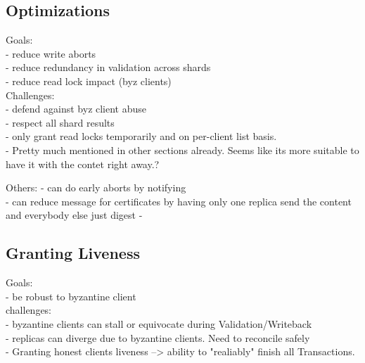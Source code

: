 \subsection{Optimizations}
Goals:\\
- reduce write aborts\\
- reduce redundancy in validation across shards\\
- reduce read lock impact (byz clients)\\

Challenges:\\
- defend against byz client abuse\\
- respect all shard results\\
- only grant read locks temporarily and on per-client list basis.\\

- Pretty much mentioned in other sections already. Seems like its more suitable to have it with the contet right away.?

Others:
- can do early aborts by notifying\\
- can reduce message for certificates by having only one replica send the content and everybody else just digest
-
\subsection{Granting Liveness}
Goals:\\
- be robust to byzantine client\\


challenges:\\
- byzantine clients can stall or equivocate during Validation/Writeback\\
- replicas can diverge due to byzantine clients. Need to reconcile safely\\
- Granting honest clients liveness --> ability to "realiably" finish all Transactions.\\


